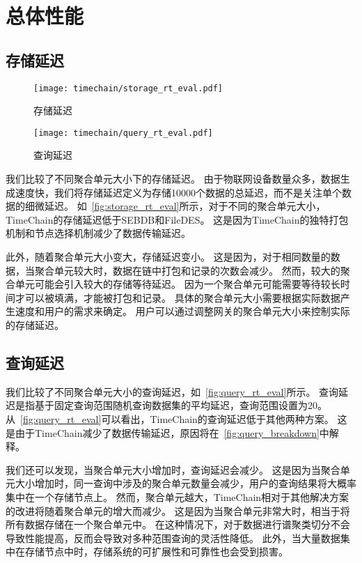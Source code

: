\section{总体性能}

\subsection{存储延迟}
\begin{figure*}[t]
    \centering
	\begin{minipage}{0.48\linewidth}
        \centering
        \texttt{[image: timechain/storage\_rt\_eval.pdf]}
        \caption{存储延迟}
        \label{fig:storage_rt_eval}
    \end{minipage}
    \quad
    \begin{minipage}{0.48\linewidth}
        \centering
        \texttt{[image: timechain/query\_rt\_eval.pdf]}
        \caption{查询延迟}
        \label{fig:query_rt_eval}
	\end{minipage}
\end{figure*}
我们比较了不同聚合单元大小下的存储延迟。
由于物联网设备数量众多，数据生成速度快，我们将存储延迟定义为存储10000个数据的总延迟，而不是关注单个数据的细微延迟。
如~\autoref{fig:storage_rt_eval}所示，对于不同的聚合单元大小，TimeChain的存储延迟低于SEBDB和FileDES。
这是因为TimeChain的独特打包机制和节点选择机制减少了数据传输延迟。

此外，随着聚合单元大小变大，存储延迟变小。
这是因为，对于相同数量的数据，当聚合单元较大时，数据在链中打包和记录的次数会减少。
然而，较大的聚合单元可能会引入较大的存储等待延迟。
因为一个聚合单元可能需要等待较长时间才可以被填满，才能被打包和记录。
具体的聚合单元大小需要根据实际数据产生速度和用户的需求来确定。
用户可以通过调整网关的聚合单元大小来控制实际的存储延迟。

\subsection{查询延迟}
我们比较了不同聚合单元大小的查询延迟，如~\autoref{fig:query_rt_eval}所示。
查询延迟是指基于固定查询范围随机查询数据集的平均延迟，查询范围设置为20。
从~\autoref{fig:query_rt_eval}可以看出，TimeChain的查询延迟低于其他两种方案。
这是由于TimeChain减少了数据传输延迟，原因将在~\autoref{fig:query_breakdown}中解释。

我们还可以发现，当聚合单元大小增加时，查询延迟会减少。
这是因为当聚合单元大小增加时，同一查询中涉及的聚合单元数量会减少，用户的查询结果将大概率集中在一个存储节点上。
然而，聚合单元越大，TimeChain相对于其他解决方案的改进将随着聚合单元的增大而减少。
这是因为当聚合单元非常大时，相当于将所有数据存储在一个聚合单元中。
在这种情况下，对于数据进行谱聚类切分不会导致性能提高，反而会导致对多种范围查询的灵活性降低。
此外，当大量数据集中在存储节点中时，存储系统的可扩展性和可靠性也会受到损害。

